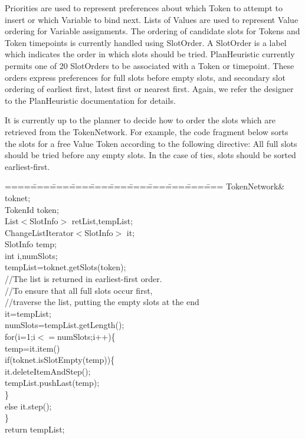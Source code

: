 Priorities are used to represent preferences about which Token to
attempt to insert or which Variable to bind next.  Lists of Values are
used to represent Value ordering for Variable assignments.  The
ordering of candidate slots for Tokens and Token timepoints is
currently handled using SlotOrder.  A SlotOrder is a label which
indicates the order in which slots should be tried.  PlanHeuristic
currently permits one of 20 SlotOrders to be associated with a Token
or timepoint.  These orders express preferences for full slots before
empty slots, and secondary slot ordering of earliest first, latest
first or nearest first.  Again, we refer the designer to the
PlanHeuristic documentation for details.

It is currently up to the planner to decide how to order the slots
which are retrieved from the TokenNetwork.  For example, the code
fragment below sorts the slots for a free Value Token according to the
following directive: All full slots should be tried before any empty
slots.  In the case of ties, slots should be sorted earliest-first.

\begin{tabbing}
====\====\====\====\====\====\====\====\====\====\====\kill
TokenNetwork\& toknet;\\
TokenId token;\\
List$<$SlotInfo$>$ retList,tempList;\\
ChangeListIterator$<$SlotInfo$>$ it;\\
SlotInfo temp;\\
int i,numSlots;\\
tempList=toknet.getSlots(token);\\
   
//The list is returned in earliest-first order.\\
//To ensure that all full slots occur first,\\
//traverse the list, putting the empty slots at the end\\
  
it=tempList;\\
numSlots=tempList.getLength();\\
for(i=1;i$<=$numSlots;i++)\{\\
\>     temp=it.item()\\
\>      if(toknet.isSlotEmpty(temp))\{\\
\> \>         it.deleteItemAndStep();\\
\> \>           tempList.pushLast(temp);\\
\>     \}\\
\>     else it.step();\\
\}\\
return tempList;\\
\end{tabbing}

